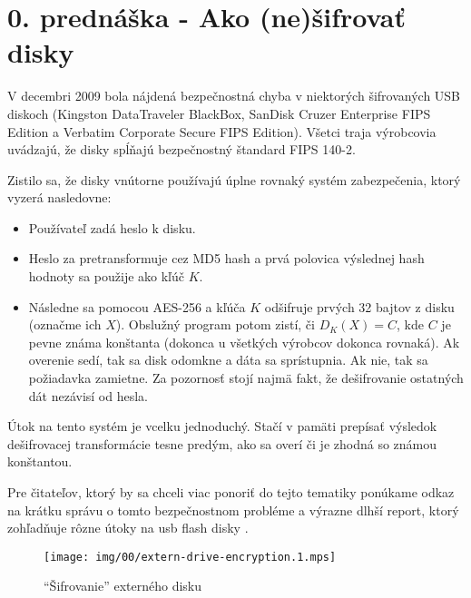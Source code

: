\section{0. prednáška - Ako (ne)šifrovať disky}

V decembri 2009 bola nájdená bezpečnostná chyba
v niektorých šifrovaných USB diskoch
(Kingston DataTraveler BlackBox, SanDisk Cruzer Enterprise FIPS Edition a
Verbatim Corporate Secure FIPS Edition).
Všetci traja výrobcovia uvádzajú, že disky spĺňajú bezpečnostný 
štandard FIPS 140-2.

Zistilo sa, že disky vnútorne používajú úplne rovnaký systém zabezpečenia,
ktorý vyzerá nasledovne:
\begin{itemize}
    \item Používateľ zadá heslo k disku.
    \item Heslo za pretransformuje cez MD5 hash a prvá polovica
        výslednej hash hodnoty sa použije ako kľúč $K$.
    \item Následne sa pomocou AES-256 a kľúča $K$ odšifruje
        prvých 32 bajtov z disku (označme ich $X$).
        Obslužný program potom zistí, či $D_K(X)=C$,
        kde $C$ je pevne známa konštanta
        (dokonca u všetkých výrobcov dokonca rovnaká).
        Ak overenie sedí, tak sa disk odomkne a dáta sa sprístupnia.
        Ak nie, tak sa požiadavka zamietne.
        Za pozornosť stojí najmä fakt, že dešifrovanie ostatných dát
        nezávisí od hesla.
\end{itemize}

Útok na tento systém je vcelku jednoduchý.
Stačí v pamäti prepísať výsledok dešifrovacej transformácie tesne
predým, ako sa overí či je zhodná so známou konštantou.

Pre čitateľov, ktorý by sa chceli viac ponoriť do tejto tematiky
ponúkame odkaz na krátku správu o tomto bezpečnostnom probléme
\cite{drive_enc} a výrazne dlhší report, ktorý zohľadňuje rôzne útoky
na usb flash disky
\cite{usb_flash_enc}.


\begin{figure}[htp]
    \centering
    \texttt{[image: img/00/extern-drive-encryption.1.mps]}
    \label{fig:extern_drive_encryption}
    \caption{``Šifrovanie'' externého disku}
\end{figure}


